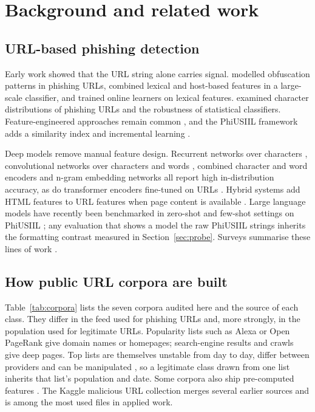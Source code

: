 \section{Background and related work}
\label{sec:related}

\subsection{URL-based phishing detection}
Early work showed that the URL string alone carries signal. \citet{garera2007} modelled obfuscation patterns in phishing URLs, \citet{ma2009} combined lexical and host-based features in a large-scale classifier, and \citet{blum2010} trained online learners on lexical features. \citet{verma2015} examined character distributions of phishing URLs and the robustness of statistical classifiers. Feature-engineered approaches remain common \citep{mohammad2014,sahingoz2019,hannousse2021}, and the PhiUSIIL framework adds a similarity index and incremental learning \citep{prasad2024}.

Deep models remove manual feature design. Recurrent networks over characters \citep{bahnsen2017}, convolutional networks over characters and words \citep{le2018urlnet,aljofey2020}, combined character and word encoders \citep{tajaddodianfar2020} and n-gram embedding networks \citep{bozkir2023} all report high in-distribution accuracy, as do transformer encoders fine-tuned on URLs \citep{maneriker2021}. Hybrid systems add HTML features to URL features when page content is available \citep{aljofey2022}. Large language models have recently been benchmarked in zero-shot and few-shot settings on PhiUSIIL \citep{hasan2026}; any evaluation that shows a model the raw PhiUSIIL strings inherits the formatting contrast measured in Section~\ref{sec:probe}. Surveys summarise these lines of work \citep{khonji2013,sahoo2017,basit2021,zieni2023,safi2023}.

\subsection{How public URL corpora are built}
Table~\ref{tab:corpora} lists the seven corpora audited here and the source of each class. They differ in the feed used for phishing URLs and, more strongly, in the population used for legitimate URLs. Popularity lists such as Alexa or Open PageRank give domain names or homepages; search-engine results and crawls give deep pages. Top lists are themselves unstable from day to day, differ between providers and can be manipulated \citep{scheitle2018,lepochat2019}, so a legitimate class drawn from one list inherits that list's population and date. Some corpora also ship pre-computed features \citep{vrbancic2020,hannousse2021,linh2025}. The Kaggle malicious URL collection \citep{siddhartha2021} merges several earlier sources and is among the most used files in applied work.

